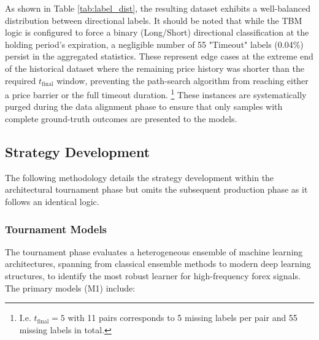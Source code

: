 \documentclass[12pt, a4paper]{article}
\begin{document}
As shown in Table \ref{tab:label_dist}, the resulting dataset exhibits a well-balanced distribution between directional labels. 
It should be noted that while the TBM logic is configured to force a binary (Long/Short) directional classification at the holding period's expiration, 
a negligible number of 55 "Timeout" labels (0.04\%) persist in the aggregated statistics. These represent edge cases at the extreme end of the historical dataset where the
remaining price history was shorter than the required \( t_{\text{final}} \) window, preventing the path-search algorithm from reaching either a price barrier or the full timeout duration.
\footnote{I.e. \( t_{\text{final}} = 5 \) with 11 pairs corresponds to 5 missing labels per pair and 55 missing labels in total.}
These instances are systematically purged during the data alignment phase to ensure that only samples with complete ground-truth outcomes are presented to the models.


\subsection{Strategy Development}

The following methodology details the strategy development within the architectural tournament phase but omits the subsequent production phase as it follows an identical logic.


\subsubsection{Tournament Models}\label{sec:tournament_models}

The tournament phase evaluates a heterogeneous ensemble of machine learning architectures, spanning from classical ensemble methods to modern deep learning structures, 
to identify the most robust learner for high-frequency forex signals. The primary models (M1) include:
\end{document}
